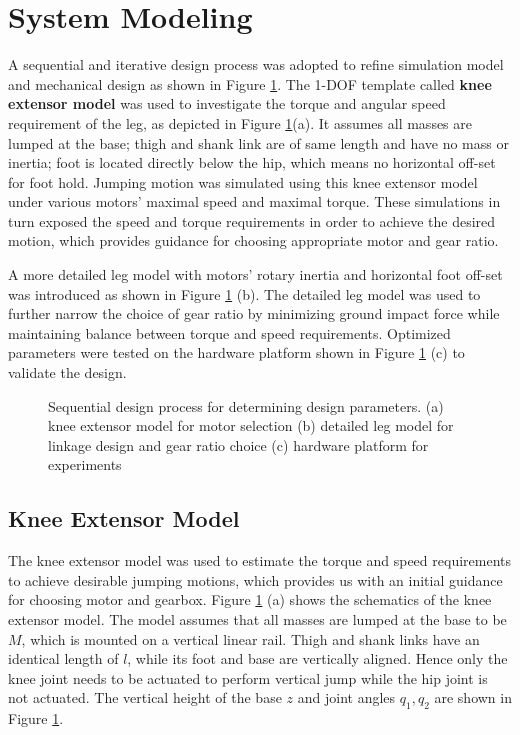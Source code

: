 \section{System Modeling}
\label{sec:systemModel}

A sequential and iterative design process was adopted to refine simulation model and mechanical design as shown in Figure \ref{fig:systemOverview}. The 1-DOF template \cite{Full1999} called \textbf{knee extensor model} was used to investigate the torque and angular speed requirement of the leg, as depicted in Figure \ref{fig:systemOverview}(a). It assumes all masses are lumped at the base; thigh and shank link are of same length and have no mass or inertia; foot is located directly below the hip, which means no horizontal off-set for foot hold. Jumping motion was simulated using this knee extensor model under various motors' maximal speed and maximal torque. These simulations in turn exposed the speed and torque requirements in order to achieve the desired motion, which provides guidance for choosing appropriate motor and gear ratio.

A more detailed leg model with motors' rotary inertia and horizontal foot off-set was introduced as shown in Figure \ref{fig:systemOverview} (b). The detailed leg model was used to further narrow the choice of gear ratio by minimizing ground impact force while maintaining balance between torque and speed requirements. Optimized parameters were tested on the hardware platform shown in Figure \ref{fig:systemOverview} (c) to validate the design.

\begin{figure}
	\centering
	\caption{Sequential design process for determining design parameters. (a) knee extensor model for motor selection (b) detailed leg model for linkage design and gear ratio choice (c) hardware platform for experiments}
	\label{fig:systemOverview}
\end{figure}

\subsection{Knee Extensor Model}
\label{sec:kneeExtensorModel}

The knee extensor model was used to estimate the torque and speed requirements to achieve desirable jumping motions, which provides us with an initial guidance for choosing motor and gearbox. Figure \ref{fig:systemOverview} (a) shows the schematics of the knee extensor model. The model assumes that all masses are lumped at the base to be $M$, which is mounted on a vertical linear rail. Thigh and shank links have an identical length of $l$, while its foot and base are vertically aligned. Hence only the knee joint needs to be actuated to perform vertical jump while the hip joint is not actuated. The vertical height of the base $z$ and joint angles $q_1, q_2$ are shown in Figure \ref{fig:systemOverview}.

